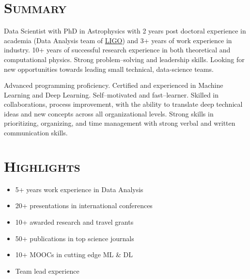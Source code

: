 \documentclass[10pt,a4paper]{moderncv}
\begin{document}
\maketitle


\section{\textsc{Summary}}
\vspace{0.2cm}

Data Scientist with PhD in Astrophysics with 2 years post doctoral experience in academia (Data Analysis team of \href{http://www.ligo.org}{LIGO}) and 3+ years of work experience in industry. 10+ years of successful research experience in both theoretical and computational physics. Strong problem–solving and leadership skills. Looking for new opportunities towards leading small technical, data-science teams.
\vspace{0.1cm}

Advanced programming proficiency. Certified and experienced in Machine Learning and Deep Learning. Self–motivated and fast–learner. Skilled in collaborations, process improvement, with the ability to translate deep technical ideas and new concepts across all organizational levels. Strong skills in prioritizing, organizing, and time management with strong verbal and written communication skills.
\vspace{0.2cm}
\section{\textsc{Highlights}}
\begin{multicols}{2}
\begin{itemize}
\item 5+ years work experience in Data Analysis
\item 20+ presentations in international conferences
\item 10+ awarded research and travel grants
\item 50+ publications in top science journals
\item 10+ MOOCs in cutting edge ML \& DL
\item Team lead experience
\end{itemize}
\end{multicols}
\end{document}
